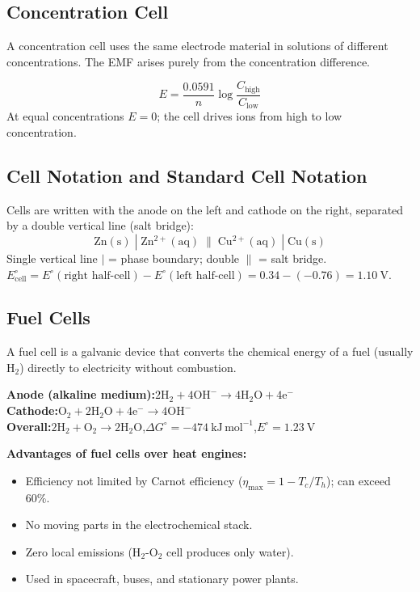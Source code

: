 \documentclass[12pt,a4paper]{article}
\begin{document}
\subsection{Concentration Cell}
A concentration cell uses the same electrode material in solutions of different concentrations. The EMF arises purely from the concentration difference.

\begin{tcolorbox}[formulabox, title={Concentration Cell EMF}]
\[
E = \frac{0.0591}{n}\log\frac{C_{\mathrm{high}}}{C_{\mathrm{low}}}
\]
At equal concentrations $E = 0$; the cell drives ions from high to low concentration.
\end{tcolorbox}

\subsection{Cell Notation and Standard Cell Notation}
Cells are written with the anode on the left and cathode on the right, separated by a double vertical line (salt bridge):
\[
\mathrm{Zn(s)}\;|\;\mathrm{Zn^{2+}(aq)}\;\|\;\mathrm{Cu^{2+}(aq)}\;|\;\mathrm{Cu(s)}
\]
Single vertical line $|$ = phase boundary; double $\|$ = salt bridge.\\
$E^\circ_{\mathrm{cell}} = E^\circ(\text{right half-cell}) - E^\circ(\text{left half-cell}) = 0.34 - (-0.76) = 1.10\ \mathrm{V}$.

\subsection{Fuel Cells}
A fuel cell is a galvanic device that converts the chemical energy of a fuel (usually H$_2$) directly to electricity without combustion.

\begin{tcolorbox}[formulabox, title={Hydrogen--Oxygen Fuel Cell Reactions}]
\textbf{Anode (alkaline medium):}\quad $\mathrm{2H_2 + 4OH^- \to 4H_2O + 4e^-}$\\
\textbf{Cathode:}\quad $\mathrm{O_2 + 2H_2O + 4e^- \to 4OH^-}$\\
\textbf{Overall:}\quad $\mathrm{2H_2 + O_2 \to 2H_2O}$,\quad $\Delta G^\circ = -474\ \mathrm{kJ\,mol^{-1}}$,\quad $E^\circ = 1.23\ \mathrm{V}$
\end{tcolorbox}

\textbf{Advantages of fuel cells over heat engines:}
\begin{itemize}[leftmargin=*, itemsep=1pt, topsep=2pt]
  \item Efficiency not limited by Carnot efficiency ($\eta_{\mathrm{max}} = 1-T_c/T_h$); can exceed 60\%.
  \item No moving parts in the electrochemical stack.
  \item Zero local emissions (H$_2$-O$_2$ cell produces only water).
  \item Used in spacecraft, buses, and stationary power plants.
\end{itemize}
\end{document}
